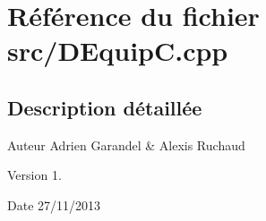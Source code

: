\section{Référence du fichier src/\-D\-Equip\-C.cpp}
\label{_d_equip_c_8cpp}


\subsection{Description détaillée}
\begin{DoxyAuthor}{Auteur}
Adrien Garandel \& Alexis Ruchaud 
\end{DoxyAuthor}
\begin{DoxyVersion}{Version}
1. 
\end{DoxyVersion}
\begin{DoxyDate}{Date}
27/11/2013 
\end{DoxyDate}

